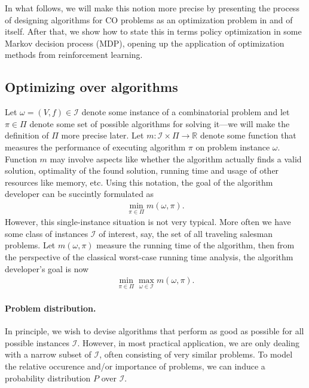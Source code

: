 \documentclass{report}
\theoremstyle{definition}
\theoremstyle{plain}
\begin{document}
In what follows, we will make this notion more precise by presenting the process
of designing algorithms for CO problems as an optimization problem in and of
itself.
%
After that, we show how to state this in terms policy optimization in some
Markov decision process (MDP), opening up the application of optimization
methods from reinforcement learning.

\subsection{Optimizing over algorithms}

%
Let $\omega = (V, f) \in \mathcal{I}$ denote some instance of a combinatorial problem
and let $\pi \in \Pi$ denote some set of possible algorithms for solving it---we will
make the definition of $\Pi$ more precise later.
%
Let $m : \mathcal{I} \times \Pi \rightarrow \mathbb{R}$ denote some function
that measures the performance of executing algorithm $\pi$ on problem instance
$\omega$. Function $m$ may involve aspects like whether the algorithm actually finds
a valid solution, optimality of the found solution, running time and usage of
other resources like memory, etc.
%
Using this notation, the goal of the algorithm developer can be succintly
formulated as
\begin{align}
  \min_{\pi \in \Pi} m(\omega, \pi) .
\end{align}
However, this single-instance situation is not very typical. More often we have
some class of instances $\mathcal{I}$ of interest, say, the set of all traveling
salesman problems.
%
Let $m(\omega, \pi)$ measure the running time of the algorithm, then from the
perspective of the classical worst-case running time analysis, the algorithm
developer's goal is now
\begin{align}
  \label{eq:min-max-runtime}
  \min_{\pi \in \Pi} \max_{\omega \in \mathcal{I}} m(\omega, \pi) .
\end{align}

\paragraph{Problem distribution.}

In principle, we wish to devise algorithms that perform as good as possible for
all possible instances $\mathcal{I}$. However, in most practical application, we
are only dealing with a narrow subset of $\mathcal{I}$, often consisting of very
similar problems.
%
To model the relative occurence and/or importance of problems, we can induce a
probability distribution $P$ over $\mathcal{I}$.
\end{document}
